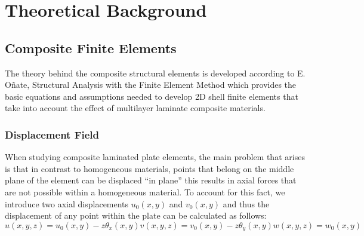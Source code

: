 
\chapter{Theoretical Background}
\label{Ch:Theory}

\section{Composite Finite Elements}\label{composite-finite-elements}

The theory behind the composite structural elements is developed according to E. Oñate, Structural Analysis with the Finite Element Method \cite{onate2013} which provides the basic equations and assumptions needed to develop 2D shell finite elements that take into account the effect of multilayer laminate composite materials.

\subsection{Displacement Field}\label{displacement-field}

When studying composite laminated plate elements, the main problem that arises is that in contrast to homogeneous materials, points that belong on the middle plane of the element can be displaced ``in plane'' this results in axial forces that are not possible within a homogeneous material. To account for this fact, we introduce two axial displacements $u_0(x,y)$ and $v_0(x,y)$ and thus the displacement of any point within the plate can be calculated as follows:
\begin{subequations}
    \label{eq:disp_field}
    \begin{equation}
        u(x,y,z)=u_0(x,y) -z\theta_x (x,y)
    \end{equation}
    \begin{equation}
        v(x,y,z)=v_0(x,y) -z\theta_y (x,y)
    \end{equation}
    \begin{equation}
        w(x,y,z)=w_0 (x,y)
    \end{equation}
\end{subequations}

